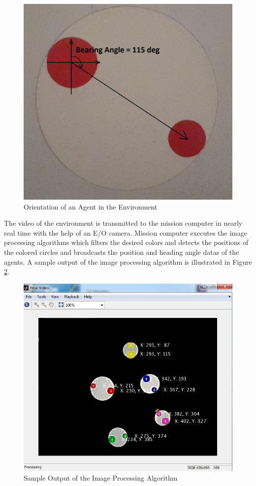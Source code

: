 \begin{figure}[H]
\caption{Orientation of an Agent in the Environment} \label{bearing_ref}
\centerline{\includegraphics[scale = 0.16]{Bearing_Angle}}
\end{figure} 


The video of the environment is transmitted to the mission computer in nearly real time with the help of an E/O camera. Mission computer executes the image processing algorithms which filters the desired colors and detects the positions of the colored circles and broadcasts the position and heading angle datas of the agents. A sample output of the image processing algorithm is illustrated in Figure \ref{imageprocess_ref}. 
		
\begin{figure}[H]
\caption{Sample Output of the Image Processing Algorithm} \label{imageprocess_ref}
\centerline{\includegraphics[scale = 0.50]{Image_Processing}}
\end{figure} 
		


